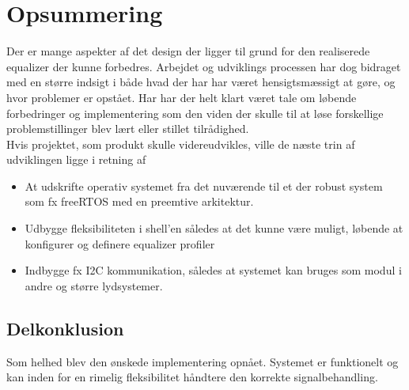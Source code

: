 \section{Opsummering}
Der er mange aspekter af det design der ligger til grund for den realiserede equalizer der kunne forbedres.
Arbejdet og udviklings processen har dog bidraget med en større indsigt i både hvad der har har været hensigtsmæssigt at gøre, og hvor problemer er opstået.
Har har der helt klart været tale om løbende forbedringer og implementering som den viden der skulle til at løse forskellige problemstillinger blev lært eller stillet tilrådighed.\\

Hvis projektet, som produkt skulle videreudvikles, ville de næste trin af udviklingen ligge i retning af
\begin{itemize}
	\item At udskrifte operativ systemet fra det nuværende til et der robust system som fx freeRTOS med en preemtive arkitektur.
	\item Udbygge fleksibiliteten i shell'en således at det kunne være muligt, løbende at konfigurer og definere equalizer profiler
	\item Indbygge fx I2C kommunikation, således at systemet kan bruges som modul i andre og større lydsystemer.
\end{itemize} 

\subsection{Delkonklusion}
Som helhed blev den ønskede implementering opnået.
Systemet er funktionelt og kan inden for en rimelig fleksibilitet håndtere den korrekte signalbehandling.

